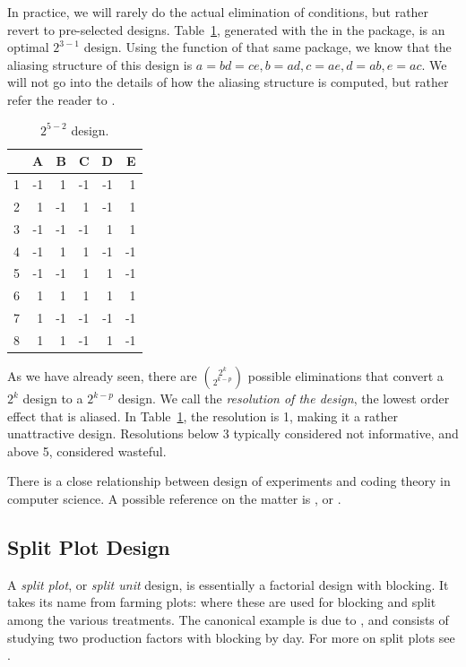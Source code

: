 In practice, we will rarely do the actual elimination of conditions, but rather revert to pre-selected designs. 
Table~\ref{tab:partial_factorial_ii}, generated with the  in the  \R package, is an optimal $2^{3-1}$ design.
Using the  function of that same package, we know that the aliasing structure of this design is
$a=bd=ce, b=ad, c=ae, d=ab, e=ac$.
We will not go into the details of how the aliasing structure is computed, but rather refer the reader to \cite{cox_theory_2000}.
\begin{table}[ht]
\centering
\begin{tabular}{rrrrrr}
  \hline
 & A & B & C & D & E \\ 
  \hline
1 & -1 & 1 & -1 & -1 & 1 \\ 
  2 & 1 & -1 & 1 & -1 & 1 \\ 
  3 & -1 & -1 & -1 & 1 & 1 \\ 
  4 & -1 & 1 & 1 & -1 & -1 \\ 
  5 & -1 & -1 & 1 & 1 & -1 \\ 
  6 & 1 & 1 & 1 & 1 & 1 \\ 
  7 & 1 & -1 & -1 & -1 & -1 \\ 
  8 & 1 & 1 & -1 & 1 & -1 \\ 
   \hline
\end{tabular}
\label{tab:partial_factorial_ii}
\caption[Fractional Factorial Design]{$2^{5-2}$ design.}
\end{table}


\begin{definition}
As we have already seen, there are $\binom{2^k}{2^{k-p}}$ possible eliminations that convert a $2^k$ design to a $2^{k-p}$ design.
We call the \emph{resolution of the design}, the lowest order effect that is aliased. 
In Table~\ref{tab:partial_factorial_ii}, the resolution is 1, making it a rather unattractive design. 
Resolutions below 3 typically considered not informative, and above 5, considered wasteful.
\end{definition}


\begin{extra}
There is a close relationship between design of experiments and coding theory in computer science. 
A possible reference on the matter is \cite{hill_first_1986}, or \cite{hedayat_orthogonal_1999}.
\end{extra}



\subsection{Split Plot Design}
\label{sec:split_plot}
A \emph{split plot}, or \emph{split unit} design, is essentially a factorial design with blocking. 
It takes its name from farming plots: where these are used for blocking and split among the various treatments. 
The canonical example is due to \cite[Sec.12.4]{montgomery_design_2012}, and consists of studying two production factors with blocking by day. 
For more on split plots see \cite[Sec.6.4]{cox_theory_2000}.



